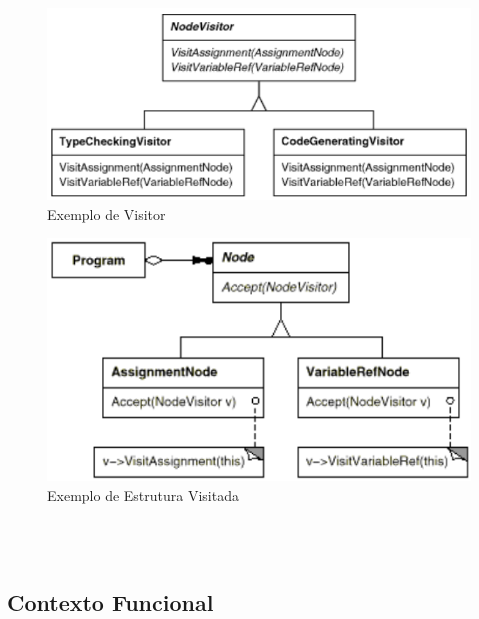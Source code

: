 \begin{figure}[htb]
	\caption{\label{visitor_exemplo1}Exemplo de Visitor}
	\begin{center}
	    \includegraphics[scale=0.3]{5_padroes-contexto-funcional/5.3_comportamentais/5.3.11_visitor/visitor_exemplo1.png}
	\end{center}
\end{figure}

\begin{figure}[htb]
	\caption{\label{visitor_exemplo2}Exemplo de Estrutura Visitada}
	\begin{center}
	    \includegraphics[scale=0.3]{5_padroes-contexto-funcional/5.3_comportamentais/5.3.11_visitor/visitor_exemplo2.png}
	\end{center}
\end{figure}

\begin{lstlisting}[caption={Visitor Orientação a Objetos},label=oovisitor]



\end{lstlisting}

\subsection*{Contexto Funcional}

